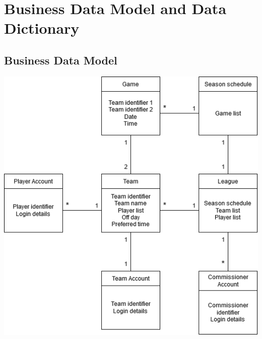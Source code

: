 \documentclass[12pt]{article}
\begin{document}
\section{Business Data Model and Data Dictionary}
\subsection{Business Data Model}
\includegraphics[scale=0.8]{7_1_business_diagram.png}
\end{document}
